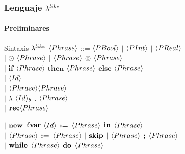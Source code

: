 \documentclass{beamer}
\begin{document}
\begin{frame}
\frametitle{Lenguaje $\lambda^{like}$}
\framesubtitle{Preliminares}

\begin{block}{Sintaxis $\lambda^{like}$}
$\langle Phrase \rangle$ ::= $\langle PBool \rangle$ $|$ $\langle PInt \rangle$ $|$ $\langle PReal \rangle$\\
\quad \quad \quad \quad \quad
$|$ $\odot$ $\langle Phrase \rangle$ $|$ $\langle Phrase \rangle$ $\circledcirc$ $\langle Phrase \rangle$\\
\quad \quad \quad \quad \quad
$|$ $\textbf{if}$ $\langle Phrase \rangle$ $\textbf{then}$ $\langle Phrase \rangle$ $\textbf{else}$ $\langle Phrase \rangle$\\
\quad \quad \quad \quad \quad
$|$ $\langle Id \rangle$\\
\quad \quad \quad \quad  \quad
$|$ $\langle Phrase \rangle\langle Phrase \rangle$\\
\quad \quad \quad \quad  \quad
$|$ $\lambda$ $\langle Id \rangle_\theta$ . $\langle Phrase \rangle$\\
\quad \quad \quad \quad  \quad
$|$ $\textbf{rec} \langle Phrase \rangle$\\

\pause

\quad \quad \quad \quad  \quad
$|$ $\textbf{new}$ $\delta \textbf{var}$ $\langle Id \rangle$ $\textbf{:=}$ $\langle Phrase \rangle$ $\textbf{in}$ $\langle Phrase \rangle$\\
\quad \quad \quad \quad  \quad
$|$ $\langle Phrase \rangle$ $\textbf{:=}$ $\langle Phrase \rangle$ $|$ $\textbf{skip}$ $|$ $\langle Phrase \rangle$ $\textbf{;}$ $\langle Phrase \rangle$\\
\quad \quad \quad \quad  \quad
$|$ $\textbf{while}$ $\langle Phrase \rangle$ $\textbf{do}$ $\langle Phrase \rangle$
\end{block}

\end{frame}
\end{document}
